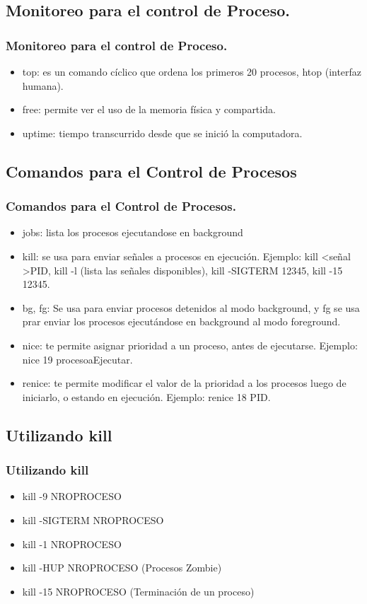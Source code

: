 \documentclass{beamer}
\begin{document}
\subsection{ Monitoreo para el control de Proceso.}
\begin{frame}
\frametitle{Monitoreo para el control de Proceso.}
\begin{itemize}
\item top: es un comando c\'iclico que ordena los primeros 20 procesos, htop (interfaz humana).
\item free: permite ver el uso de la memoria f\'isica y compartida.
\item uptime: tiempo transcurrido desde que se inici\'o la computadora.
\end{itemize}
\end{frame}


\subsection{Comandos para el Control de Procesos}
\begin{frame}
\frametitle{Comandos para el Control de Procesos.}
\begin{itemize}
\item jobs: lista los procesos ejecutandose en background
\item kill: se usa para enviar se\~nales a procesos en ejecuci\'on. Ejemplo: kill \textless se\~nal \textgreater PID, kill -l (lista las se\~nales disponibles), kill -SIGTERM 12345, kill -15 12345.
\item bg, fg: Se usa para enviar procesos detenidos al modo background, y fg se usa prar enviar los procesos ejecut\'andose en background al modo foreground.
\item nice: te permite asignar prioridad a un proceso, antes de ejecutarse. Ejemplo: nice 19 procesoaEjecutar.
\item renice:  te permite modificar el valor de la prioridad a los procesos luego de iniciarlo, o estando en ejecuci\'on. Ejemplo:  renice 18 PID.
\end{itemize}
\end{frame}

\subsection{Utilizando kill}
\begin{frame}
\frametitle{Utilizando kill}
\begin{itemize}
\item kill -9 NROPROCESO
\item kill -SIGTERM NROPROCESO
\item kill -1 NROPROCESO
\item kill -HUP NROPROCESO (Procesos Zombie)
\item kill -15 NROPROCESO (Terminaci\'on de un proceso)
\end{itemize}
\end{frame}
\end{document}
